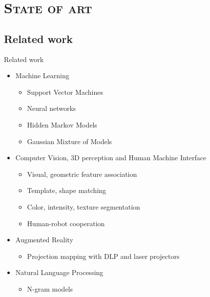\section{\scshape State of art}\label{sec:state-of-art}

\subsection{Related work}
\begin{frame}{Related work}
	\begin{itemize}
		\item Machine Learning
		\begin{itemize}
			\item Support Vector Machines
			\item Neural networks
			\item Hidden Markov Models
			\item Gaussian Mixture of Models
		\end{itemize}
		\item Computer Vision, 3D perception and Human Machine Interface
		\begin{itemize}
			\item Visual, geometric feature association
			\item Template, shape matching
			\item Color, intensity, texture segmentation
			\item Human-robot cooperation
		\end{itemize}
		\item Augmented Reality
		\begin{itemize}
			\item Projection mapping with DLP and laser projectors
		\end{itemize}
		\item Natural Language Processing
		\begin{itemize}
			\item N-gram models
		\end{itemize}
	\end{itemize}
\end{frame}

